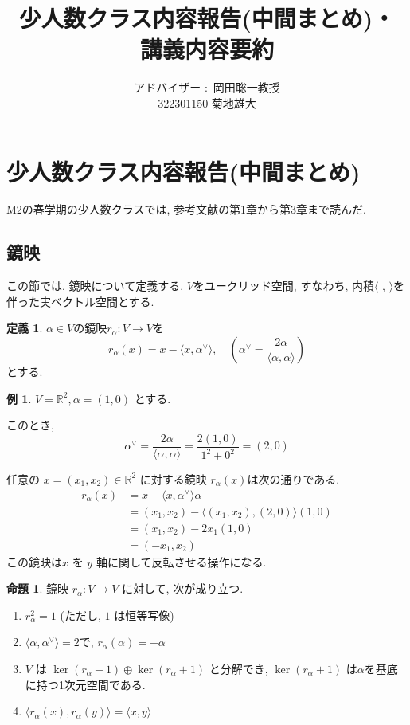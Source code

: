 \documentclass[a4,12pt, titlepage]{jarticle}
\title{少人数クラス内容報告(中間まとめ)・\\ 講義内容要約}
\author{ アドバイザー $\colon$ 岡田聡一教授 \\[50pt]
322301150 \quad 菊地雄大}
\date{}
\theoremstyle{definition}
\newtheorem{df}{定義}
\newtheorem{prop}[thm]{命題}
\newtheorem*{ex}{例}
\begin{document}
\maketitle
%
%
\section{少人数クラス内容報告(中間まとめ)}
  M2の春学期の少人数クラスでは, 参考文献\cite{b1}の第1章から第3章まで読んだ.
%
\subsection{鏡映}
  この節では, 鏡映について定義する.
  $V$をユークリッド空間, すなわち, 内積$\langle$ , $\rangle$を伴った実ベクトル空間とする.
\bigskip

\begin{df}
  $ \alpha \in V $の鏡映$r_\alpha: V \to V $を
  \[
  r_\alpha (x) = x - \langle x , \alpha^{ \vee } \rangle, \quad \left( \alpha^{ \vee } = \frac{2 \alpha}{\langle \alpha, \alpha \rangle} \right)
  \]
  とする.
\end{df}

\begin{ex}
  $V = \mathbb{R}^2, \alpha = (1, 0)$ とする.
  
  このとき, 
  \[
  \alpha^{\vee} = \frac{2 \alpha}{\langle \alpha, \alpha \rangle} = \frac{2 (1, 0)}{1^2 + 0^2} = (2, 0)
  \]

  任意の $x = (x_1, x_2) \in \mathbb{R}^2$ に対する鏡映 $r_\alpha(x)$は次の通りである.
  \[
  \begin{aligned}
    r_\alpha(x) &= x - \langle x, \alpha^{\vee} \rangle \alpha \\
    &= (x_1, x_2) - \langle (x_1, x_2), (2, 0) \rangle (1, 0) \\
    &= (x_1, x_2) - 2x_1 (1, 0) \\
    &= (-x_1, x_2)
  \end{aligned}
  \]
  この鏡映は$x$ を $y$ 軸に関して反転させる操作になる.
\end{ex}

\begin{prop}
  鏡映 $r_\alpha: V \to V $ に対して, 次が成り立つ. 
  \begin{enumerate}
    \item $r_\alpha^2 = 1$ \quad (ただし, $1$ は恒等写像)
    \item $ \langle \alpha, \alpha^{\vee} \rangle = 2 $で, $r_\alpha(\alpha) = - \alpha$
    \item $V$ は $ \ker(r_\alpha - 1) \oplus \ker(r_\alpha + 1)$ と分解でき, $\ker(r_\alpha + 1)$ は$\alpha$を基底に持つ1次元空間である. 
    \item $\langle r_\alpha(x), r_\alpha(y) \rangle = \langle x, y \rangle $
  \end{enumerate}
\end{prop}
\end{document}

